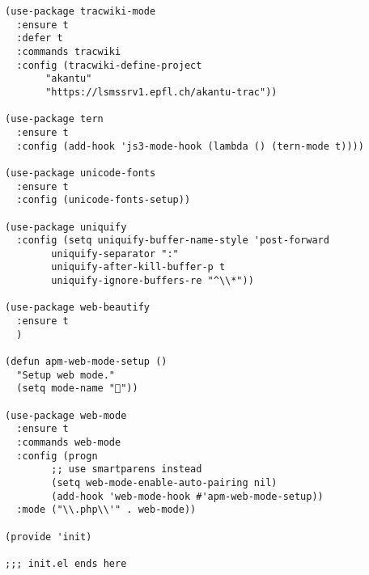 \documentclass[11pt]{article}
\begin{document}
\begin{verbatim}
(use-package tracwiki-mode
  :ensure t
  :defer t
  :commands tracwiki
  :config (tracwiki-define-project
	   "akantu"
	   "https://lsmssrv1.epfl.ch/akantu-trac"))

(use-package tern
  :ensure t
  :config (add-hook 'js3-mode-hook (lambda () (tern-mode t))))

(use-package unicode-fonts
  :ensure t
  :config (unicode-fonts-setup))

(use-package uniquify
  :config (setq uniquify-buffer-name-style 'post-forward
		uniquify-separator ":"
		uniquify-after-kill-buffer-p t
		uniquify-ignore-buffers-re "^\\*"))

(use-package web-beautify
  :ensure t
  )

(defun apm-web-mode-setup ()
  "Setup web mode."
  (setq mode-name ""))

(use-package web-mode
  :ensure t
  :commands web-mode
  :config (progn
	    ;; use smartparens instead
	    (setq web-mode-enable-auto-pairing nil)
	    (add-hook 'web-mode-hook #'apm-web-mode-setup))
  :mode ("\\.php\\'" . web-mode))

(provide 'init)

;;; init.el ends here
\end{verbatim}
\end{document}
